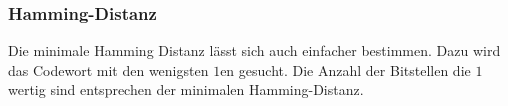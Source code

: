 
\subsubsection{Hamming-Distanz}
\begin{bem}
	Die minimale Hamming Distanz lässt sich auch einfacher bestimmen. Dazu wird das Codewort mit den wenigsten $1$en gesucht. Die Anzahl der Bitstellen die $1$wertig sind entsprechen der minimalen Hamming-Distanz.
\end{bem}